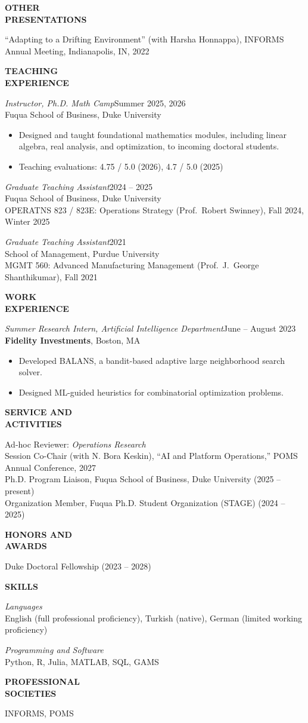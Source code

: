 \documentclass[10pt,letterpaper]{article}
\newlength{\labelw}\setlength{\labelw}{1.35in}
\newlength{\gapw}\setlength{\gapw}{0.1in}
\newlength{\bodyw}\setlength{\bodyw}{\dimexpr\textwidth-\labelw-\gapw\relax}
\newcommand{\cvsection}[2]{%
  \par\vspace{16pt}%
  \noindent\begin{minipage}[t]{\labelw}\raggedright\textbf{#1}\end{minipage}%
  \hspace{\gapw}%
  \begin{minipage}[t]{\bodyw}#2\end{minipage}\par}
\newcommand{\entry}[2]{{\itshape #1}\hfill #2}
\newcommand{\entrygap}{\par\vspace{12pt}}
\begin{document}
\cvsection{OTHER\\PRESENTATIONS}{%
``Adapting to a Drifting Environment'' (with Harsha Honnappa), INFORMS Annual Meeting, Indianapolis, IN, 2022
}

\cvsection{TEACHING\\EXPERIENCE}{%
\entry{Instructor, Ph.D. Math Camp}{Summer 2025, 2026}\\
Fuqua School of Business, Duke University
\begin{itemize}
  \item Designed and taught foundational mathematics modules, including linear algebra, real analysis, and optimization, to incoming doctoral students.
  \item Teaching evaluations: 4.75 / 5.0 (2026), 4.7 / 5.0 (2025)
\end{itemize}
\entrygap
\entry{Graduate Teaching Assistant}{2024 -- 2025}\\
Fuqua School of Business, Duke University\\
OPERATNS 823 / 823E: Operations Strategy (Prof.\ Robert Swinney), Fall 2024, Winter 2025
\entrygap
\entry{Graduate Teaching Assistant}{2021}\\
School of Management, Purdue University\\
MGMT 560: Advanced Manufacturing Management (Prof.\ J.\ George Shanthikumar), Fall 2021
}

\cvsection{WORK\\EXPERIENCE}{%
\entry{Summer Research Intern, Artificial Intelligence Department}{June -- August 2023}\\
\textbf{Fidelity Investments}, Boston, MA
\begin{itemize}
  \item Developed BALANS, a bandit-based adaptive large neighborhood search solver.
  \item Designed ML-guided heuristics for combinatorial optimization problems.
\end{itemize}
}

\cvsection{SERVICE AND\\ACTIVITIES}{%
Ad-hoc Reviewer: \textit{Operations Research}\\
Session Co-Chair (with N. Bora Keskin), ``AI and Platform Operations,'' POMS Annual Conference, 2027\\
Ph.D. Program Liaison, Fuqua School of Business, Duke University (2025 -- present)\\
Organization Member, Fuqua Ph.D. Student Organization (STAGE) (2024 -- 2025)
}

\cvsection{HONORS AND\\AWARDS}{%
Duke Doctoral Fellowship (2023 -- 2028)
}

\cvsection{SKILLS}{%
\textit{Languages}\\
English (full professional proficiency), Turkish (native), German (limited working proficiency)
\entrygap
\textit{Programming and Software}\\
Python, R, Julia, MATLAB, SQL, GAMS
}

\cvsection{PROFESSIONAL\\SOCIETIES}{%
INFORMS, POMS
}
\end{document}
